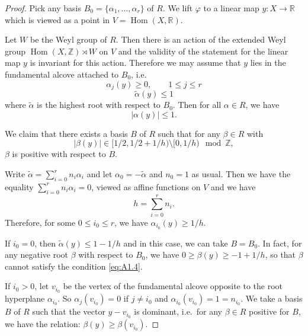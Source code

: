 \documentclass[11pt,a4paper]{article}
\theoremstyle{plain}
\theoremstyle{definition}
\DeclareMathOperator{\Hom}{Hom}
\newcommand{\ZZ}{\mathbb{Z}}
\newcommand{\RR}{\mathbb{R}}
\begin{document}
\begin{proof}
Pick any basis $B_0 = \{\alpha_1, \ldots, \alpha_r\}$ of $R$. We lift $\varphi$ to a linear map $y : X \to \RR$ which is viewed as a point in $V = \Hom(X, \RR)$.

Let $W$ be the Weyl group of $R$. Then there is an action of the extended Weyl group $\Hom(X, \ZZ) \rtimes W$ on $V$ and the validity of the statement for the linear map $y$ is invariant for this action. Therefore we may assume that $y$ lies in the fundamental alcove attached to $B_0$, i.e.
\begin{equation} \label{eq:A1.1}
\alpha_j(y) \geq 0, \qquad 1 \leq j \leq r
\end{equation}
\begin{equation} \label{eq:A1.2}
\tilde{\alpha}(y) \leq 1
\end{equation}
where $\tilde{\alpha}$ is the highest root with respect to $B_0$. Then for all $\alpha \in R$, we have
\begin{equation} \label{eq:A1.3}
|\alpha(y)| \leq 1.
\end{equation}

We claim that there exists a basis $B$ of $R$ such that for any $\beta \in R$ with
\begin{equation} \label{eq:A1.4}
|\beta(y)| \in [1/2, 1/2 + 1/h) \setminus [0, 1/h) \mod \ZZ,
\end{equation}
$\beta$ is positive with respect to $B$.

Write $\tilde{\alpha} = \sum_{i=0}^r n_i \alpha_i$ and let $\alpha_0 = -\tilde{\alpha}$ and $n_0 = 1$ as usual. Then we have the equality $\sum_{i=0}^r n_i \alpha_i = 0$, viewed as affine functions on $V$ and we have
\begin{equation} \label{eq:A1.5}
h = \sum_{i=0}^r n_i.
\end{equation}
Therefore, for some $0 \leq i_0 \leq r$, we have $\alpha_{i_0}(y) \geq 1/h$.

If $i_0 = 0$, then $\tilde{\alpha}(y) \leq 1 - 1/h$ and in this case, we can take $B = B_0$. In fact, for any negative root $\beta$ with respect to $B_0$, we have $0 \geq \beta(y) \geq -1 + 1/h$, so that $\beta$ cannot satisfy the condition \eqref{eq:A1.4}.

If $i_0 > 0$, let $v_{i_0}$ be the vertex of the fundamental alcove opposite to the root hyperplane $\alpha_{i_0}$. So $\alpha_j(v_{i_0}) = 0$ if $j \neq i_0$ and $\alpha_{i_0}(v_{i_0}) = 1 = n_{i_0}$. We take a basis $B$ of $R$ such that the vector $y - v_{i_0}$ is dominant, i.e.~for any $\beta \in R$ positive for $B$, we have the relation: $\beta(y) \geq \beta(v_{i_0})$.


\end{proof}
\end{document}

